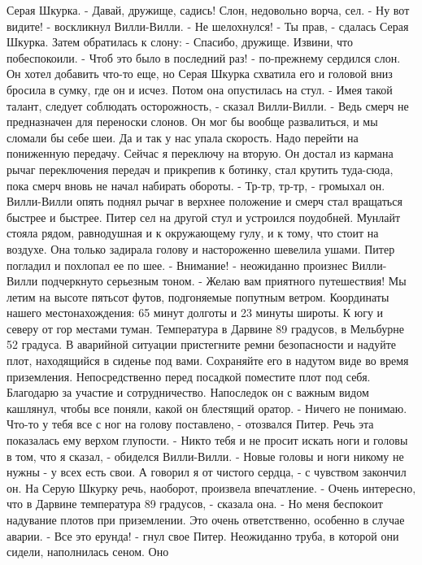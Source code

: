 Серая Шкурка. - Давай, дружище, садись!
    Слон, недовольно ворча, сел.
    - Ну вот видите! - воскликнул Вилли-Вилли. - Не шелохнулся!
    - Ты прав, - сдалась Серая Шкурка. Затем обратилась к слону: - 
Спасибо, дружище. Извини, что побеспокоили.
    - Чтоб это было в последний раз! - по-прежнему сердился слон. Он 
хотел добавить что-то еще, но Серая Шкурка схватила его и головой вниз 
бросила в сумку, где он и исчез. Потом она опустилась на стул.
    - Имея такой талант, следует соблюдать осторожность, - сказал 
Вилли-Вилли. - Ведь смерч не предназначен для переноски слонов. Он мог 
бы вообще развалиться, и мы сломали бы себе шеи. Да и так у нас упала 
скорость. Надо перейти на пониженную передачу. Сейчас я переключу на 
вторую.
    Он достал из кармана рычаг переключения передач и прикрепив к 
ботинку, стал крутить туда-сюда, пока смерч вновь не начал набирать 
обороты.
    - Тр-тр, тр-тр, - громыхал он. Вилли-Вилли опять поднял рычаг в 
верхнее положение и смерч стал вращаться быстрее и быстрее.
    Питер сел на другой стул и устроился поудобней. Мунлайт стояла 
рядом, равнодушная и к окружающему гулу, и к тому, что стоит на 
воздухе. Она только задирала голову и настороженно шевелила ушами.
    Питер погладил и похлопал ее по шее.
    - Внимание! - неожиданно произнес Вилли-Вилли подчеркнуто 
серьезным тоном. - Желаю вам приятного путешествия! Мы летим на высоте 
пятьсот футов, подгоняемые попутным ветром. Координаты нашего 
местонахождения: 65 минут долготы и 23 минуты широты. К югу и северу 
от гор местами туман. Температура в Дарвине 89 градусов, в Мельбурне 
52 градуса. В аварийной ситуации пристегните ремни безопасности и 
надуйте плот, находящийся в сиденье под вами. Сохраняйте его в надутом 
виде во время приземления. Непосредственно перед посадкой поместите 
плот под себя. Благодарю за участие и сотрудничество.
    Напоследок он с важным видом кашлянул, чтобы все поняли, какой он 
блестящий оратор.
    - Ничего не понимаю. Что-то у тебя все с ног на голову поставлено, 
- отозвался Питер. Речь эта показалась ему верхом глупости.
    - Никто тебя и не просит искать ноги и головы в том, что я сказал, 
- обиделся Вилли-Вилли. - Новые головы и ноги никому не нужны - у всех 
есть свои. А говорил я от чистого сердца, - с чувством закончил он.
    На Серую Шкурку речь, наоборот, произвела впечатление.
    - Очень интересно, что в Дарвине температура 89 градусов, - 
сказала она. - Но меня беспокоит надувание плотов при приземлении. Это 
очень ответственно, особенно в случае аварии.
    - Все это ерунда! - гнул свое Питер.
    Неожиданно труба, в которой они сидели, наполнилась сеном. Оно 
